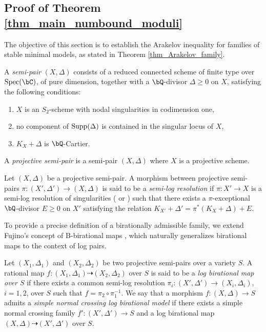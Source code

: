 \documentclass[11pt,letterpaper]{amsart}
\numberwithin{equation}{section}
\begin{document}
	\subsection{Proof of Theorem \ref{thm_main_numbound_moduli}}\label{section_VZHiggs_stable_family}
	The objective of this section is to establish the Arakelov inequality for families of stable minimal models, as stated in Theorem \ref{thm_Arakelov_family}.
	\begin{defn}\label{defn_semipair}
		A \emph{semi-pair} $(X, \Delta)$ consists of a reduced connected scheme of finite type over ${\rm Spec}(\bC)$, of pure dimension, together with a $\bQ$-divisor $\Delta\geq 0$ on $X$, satisfying the following conditions:  
		\begin{enumerate}  
			\item $X$ is an $S_2$-scheme with nodal singularities in codimension one,  
			\item no component of ${\rm Supp}(\Delta)$ is contained in the singular locus of $X$,  
			\item $K_X + \Delta$ is $\bQ$-Cartier.  
		\end{enumerate}  
		A \emph{projective semi-pair} is a semi-pair $(X, \Delta)$ where $X$ is a projective scheme.
	\end{defn}
	\begin{defn}\label{defn_semiresolution_semipair}
		Let $(X, \Delta)$ be a projective semi-pair. A morphism between projective semi-pairs $\pi: (X', \Delta') \to (X, \Delta)$ is said to be a \textit{semi-log resolution} if $\pi: X' \to X$ is a semi-log resolution of singularities (\cite{Bierstone2013} or \cite[\S 10.4]{Kollar2013}) such that there exists a $\pi$-exceptional $\bQ$-divisor $E \geq 0$ on $X'$ satisfying the relation $K_{X'} + \Delta' = \pi^{\ast}(K_X + \Delta) + E$.
	\end{defn}
	To provide a precise definition of a birationally admissible family, we extend Fujino's concept of B-birational maps \cite[Definition 1.5]{Fujino2000}, which naturally generalizes birational maps to the context of log pairs.
	\begin{defn}
		Let $(X_1, \Delta_1)$ and $(X_2, \Delta_2)$ be two projective semi-pairs over a variety $S$. A rational map $f: (X_1, \Delta_1) \dasharrow (X_2, \Delta_2)$ over $S$ is said to be a \textit{log birational map over $S$} if there exists a common semi-log resolution $\pi_i: (X', \Delta') \to (X_i, \Delta_i)$, $i = 1, 2$, over $S$ such that $f = \pi_2 \circ \pi_1^{-1}$. We say that a morphism $f: (X, \Delta) \to S$ admits a \textit{simple normal crossing log birational model} if there exists a simple normal crossing family $f': (X', \Delta') \to S$ and a log birational map $(X, \Delta) \dasharrow (X', \Delta')$ over $S$.
	\end{defn}
\end{document}
